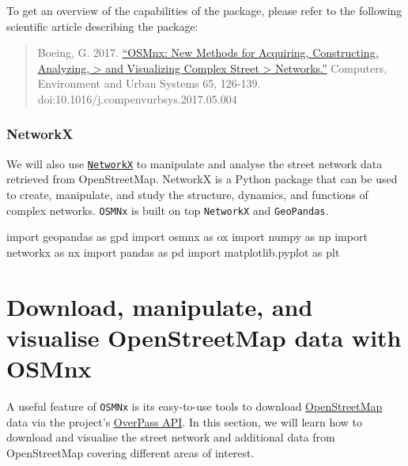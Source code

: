 \documentclass[
  letterpaper,
  DIV=11,
  numbers=noendperiod]{scrreprt}
\newenvironment{Shaded}{\begin{snugshade}}{\end{snugshade}}
\newcommand{\ImportTok}[1]{\textcolor[rgb]{0.00,0.46,0.62}{#1}}
\newcommand{\NormalTok}[1]{\textcolor[rgb]{0.00,0.23,0.31}{#1}}
\begin{document}
To get an overview of the capabilities of the package, please refer to
the following scientific article describing the package:

\begin{quote}
Boeing, G. 2017.
\href{https://www.researchgate.net/publication/309738462_OSMnx_New_Methods_for_Acquiring_Constructing_Analyzing_and_Visualizing_Complex_Street_Networks}{``OSMnx:
New Methods for Acquiring, Constructing, Analyzing, \textgreater{} and
Visualizing Complex Street \textgreater{} Networks.''} Computers,
Environment and Urban Systems 65, 126-139.
doi:10.1016/j.compenvurbsys.2017.05.004
\end{quote}

\subsubsection{NetworkX}\label{networkx}

We will also use
\href{https://networkx.github.io/documentation//}{\texttt{NetworkX}} to
manipulate and analyse the street network data retrieved from
OpenStreetMap. NetworkX is a Python package that can be used to create,
manipulate, and study the structure, dynamics, and functions of complex
networks. \texttt{OSMNx} is built on top \texttt{NetworkX} and
\texttt{GeoPandas}.

\begin{Shaded}
\begin{Highlighting}[]
\ImportTok{import}\NormalTok{ geopandas }\ImportTok{as}\NormalTok{ gpd}
\ImportTok{import}\NormalTok{ osmnx }\ImportTok{as}\NormalTok{ ox}
\ImportTok{import}\NormalTok{ numpy }\ImportTok{as}\NormalTok{ np}
\ImportTok{import}\NormalTok{ networkx }\ImportTok{as}\NormalTok{ nx}
\ImportTok{import}\NormalTok{ pandas }\ImportTok{as}\NormalTok{ pd}
\ImportTok{import}\NormalTok{ matplotlib.pyplot }\ImportTok{as}\NormalTok{ plt}
\end{Highlighting}
\end{Shaded}

\section{Download, manipulate, and visualise OpenStreetMap data with
OSMnx}\label{download-manipulate-and-visualise-openstreetmap-data-with-osmnx}

A useful feature of \texttt{OSMNx} is its easy-to-use tools to download
\href{http://www.openstreetmap.org}{OpenStreetMap} data via the
project's
\href{http://wiki.openstreetmap.org/wiki/Overpass_API}{OverPass API}. In
this section, we will learn how to download and visualise the street
network and additional data from OpenStreetMap covering different areas
of interest.
\end{document}
